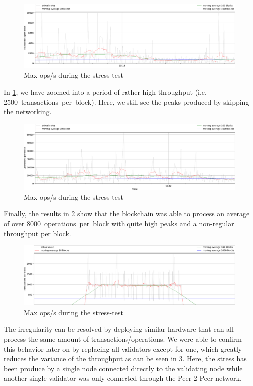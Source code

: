 \begin{figure}[!htp]
 \centering
 \includegraphics[width=\linewidth]{figures/stress-test-max-tps.png}
 \caption{Max ops/s during the stress-test}
 \label{fig:tps}
\end{figure}

In \cref{fig:tps}, we have zoomed into a period of rather high throughput (i.e.
\SI{2500}{transactions per block}). Here, we still see the peaks produced by
skipping the networking.

\begin{figure}[!htp]
 \centering
 \includegraphics[width=\linewidth]{figures/stress-test-max-ops.png}
 \caption{Max ops/s during the stress-test}
 \label{fig:ops}
\end{figure}

Finally, the results in \cref{fig:ops} show that the blockchain was able to
process an average of over \SI{8000}{operations per block} with quite high
peaks and a non-regular throughput per block.

\begin{figure}[!htp]
 \centering
 \includegraphics[width=\linewidth]{figures/stress-test-constant-load.png}
 \caption{Max ops/s during the stress-test}
 \label{fig:ops-const}
\end{figure}

The irregularity can be resolved by deploying similar hardware that can all
process the same amount of transactions/operations. We were able to confirm
this behavior later on by replacing all validators except for one, which
greatly reduces the variance of the throughput as can be seen in
\cref{fig:ops-const}. Here, the stress has been produce by a single node
connected directly to the validating node while another single validator was
only connected through the Peer-2-Peer network.
